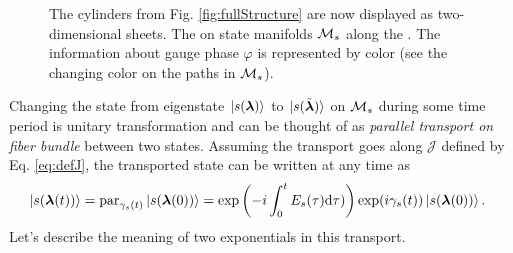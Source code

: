 \begin{figure}[H]
    \centering
\caption{The cylinders from Fig. \ref{fig:fullStructure} are now displayed as two-dimensional sheets. The  on state manifolds $\mathcal{M}_s$ along the . The information about gauge phase $\varphi$ is represented by color (see the changing color on the paths in $\mathcal{M}_s$).}
    \label{fig:manifoldCutIntuition}
\end{figure}

Changing the state from eigenstate $\ket{s({\bm\lambda})}$ to $\ket{s(\tilde{{\bm\lambda}})}$ on $\mathcal{M}_s$ during some time period is unitary transformation and can be thought of as \emph{parallel transport on fiber bundle} between two states. Assuming the transport goes along $\mathcal J$ defined by Eq. \ref{eq:defJ}, the transported state can be written at any time as
\begin{equation}
    \hspace{-5pt}\ket{s({\bm\lambda}(t))} = \textrm{par}_{\gamma_s(t)}\ket{s({\bm\lambda}(0))} = \exp\left(-i\int_0^tE_s(\tau)\mathrm{d}\tau)\right)\exp(i\gamma_s(t))\ket{s({\bm\lambda}(0))}.
    \label{eq:phasesOnManifold}
\end{equation}
Let's describe the meaning of two exponentials in this transport.
